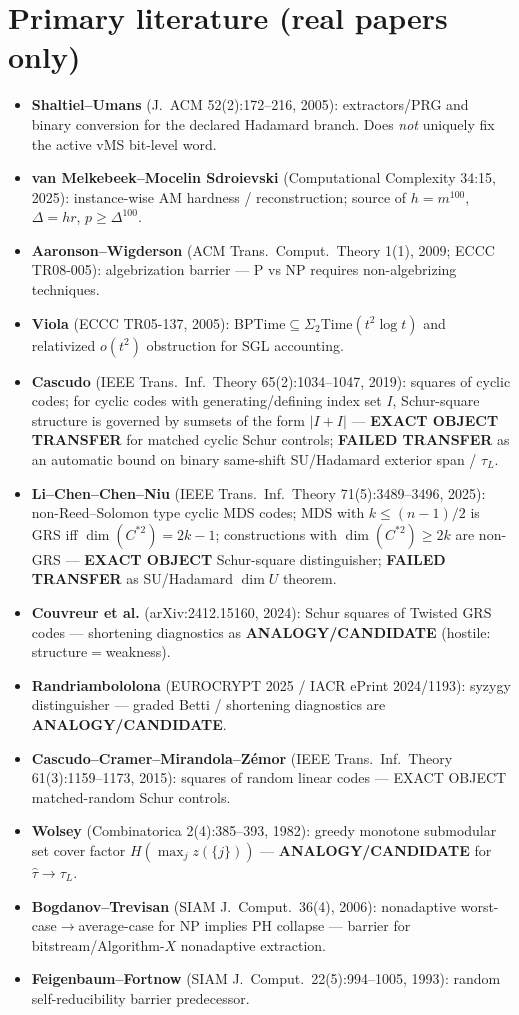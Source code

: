 \documentclass[11pt]{article}
\begin{document}
\section*{Primary literature (real papers only)}
\begin{itemize}
\item \textbf{Shaltiel--Umans} (J.~ACM 52(2):172--216, 2005): extractors/PRG and binary conversion
for the declared Hadamard branch. Does \emph{not} uniquely fix the active vMS bit-level word.
\item \textbf{van Melkebeek--Mocelin Sdroievski} (Computational Complexity 34:15, 2025): instance-wise
AM hardness / reconstruction; source of $h=m^{100}$, $\Delta=hr$, $p\ge\Delta^{100}$.
\item \textbf{Aaronson--Wigderson} (ACM Trans.\ Comput.\ Theory 1(1), 2009; ECCC TR08-005):
algebrization barrier --- P vs NP requires non-algebrizing techniques.
\item \textbf{Viola} (ECCC TR05-137, 2005): BPTime$\subseteq\Sigma_2$Time$(t^2\log t)$ and relativized
$o(t^2)$ obstruction for SGL accounting.
\item \textbf{Cascudo} (IEEE Trans.\ Inf.\ Theory 65(2):1034--1047, 2019): squares of cyclic codes;
for cyclic codes with generating/defining index set $I$, Schur-square structure is governed by
sumsets of the form $|I+I|$ --- \textbf{EXACT OBJECT TRANSFER} for matched cyclic Schur
controls; \textbf{FAILED TRANSFER} as an automatic bound on binary same-shift SU/Hadamard
exterior span / $\tau_L$.
\item \textbf{Li--Chen--Chen--Niu} (IEEE Trans.\ Inf.\ Theory 71(5):3489--3496, 2025): non-Reed--Solomon
type cyclic MDS codes; MDS with $k\le(n-1)/2$ is GRS iff $\dim(C^{*2})=2k-1$; constructions
with $\dim(C^{*2})\ge 2k$ are non-GRS --- \textbf{EXACT OBJECT} Schur-square distinguisher;
\textbf{FAILED TRANSFER} as SU/Hadamard $\dim U$ theorem.
\item \textbf{Couvreur et al.} (arXiv:2412.15160, 2024): Schur squares of Twisted GRS codes ---
shortening diagnostics as \textbf{ANALOGY/CANDIDATE} (hostile: structure$=$weakness).
\item \textbf{Randriambololona} (EUROCRYPT 2025 / IACR ePrint 2024/1193): syzygy distinguisher ---
graded Betti / shortening diagnostics are \textbf{ANALOGY/CANDIDATE}.
\item \textbf{Cascudo--Cramer--Mirandola--Z\'emor} (IEEE Trans.\ Inf.\ Theory 61(3):1159--1173, 2015):
squares of random linear codes --- EXACT OBJECT matched-random Schur controls.
\item \textbf{Wolsey} (Combinatorica 2(4):385--393, 1982): greedy monotone submodular set cover
factor $H(\max_j z(\{j\}))$ --- \textbf{ANALOGY/CANDIDATE} for $\widehat\tau\to\tau_L$.
\item \textbf{Bogdanov--Trevisan} (SIAM J.\ Comput.\ 36(4), 2006): nonadaptive worst-case$\to$average-case
for NP implies PH collapse --- barrier for bitstream/Algorithm-$X$ nonadaptive extraction.
\item \textbf{Feigenbaum--Fortnow} (SIAM J.\ Comput.\ 22(5):994--1005, 1993): random self-reducibility
barrier predecessor.
\end{itemize}
\end{document}

